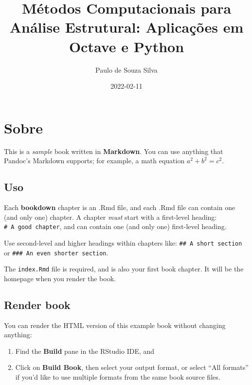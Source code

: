 \documentclass[
]{book}
\title{Métodos Computacionais para Análise Estrutural: Aplicações em Octave e Python}
\author{Paulo de Souza Silva}
\date{2022-02-11}
\begin{document}
\maketitle

{
\setcounter{tocdepth}{1}
\tableofcontents
}
\hypertarget{sobre}{%
\chapter*{Sobre}\label{sobre}}

This is a \emph{sample} book written in \textbf{Markdown}. You can use anything that Pandoc's Markdown supports; for example, a math equation \(a^2 + b^2 = c^2\).

\hypertarget{uso}{%
\section*{Uso}\label{uso}}

Each \textbf{bookdown} chapter is an .Rmd file, and each .Rmd file can contain one (and only one) chapter. A chapter \emph{must} start with a first-level heading: \texttt{\#\ A\ good\ chapter}, and can contain one (and only one) first-level heading.

Use second-level and higher headings within chapters like: \texttt{\#\#\ A\ short\ section} or \texttt{\#\#\#\ An\ even\ shorter\ section}.

The \texttt{index.Rmd} file is required, and is also your first book chapter. It will be the homepage when you render the book.

\hypertarget{render-book}{%
\section*{Render book}\label{render-book}}

You can render the HTML version of this example book without changing anything:

\begin{enumerate}
\def\labelenumi{\arabic{enumi}.}
\item
  Find the \textbf{Build} pane in the RStudio IDE, and
\item
  Click on \textbf{Build Book}, then select your output format, or select ``All formats'' if you'd like to use multiple formats from the same book source files.
\end{enumerate}
\end{document}
